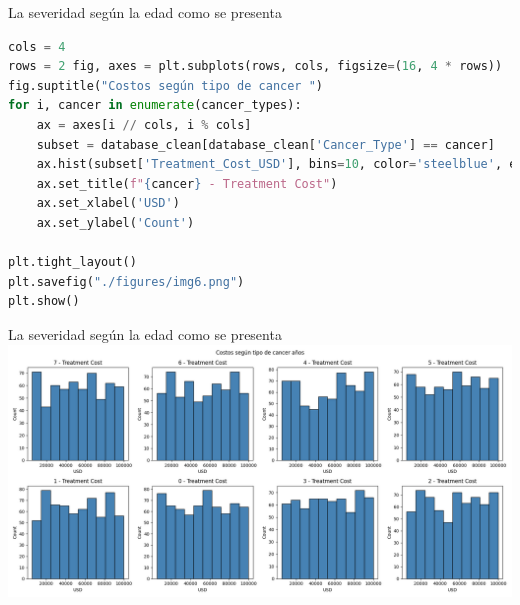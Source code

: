 \documentclass{beamer}
\begin{document}
    \begin{frame}[fragile]{ La severidad según la edad como se presenta }
        \tiny
    \begin{lstlisting}[language=Python]
cols = 4
rows = 2 fig, axes = plt.subplots(rows, cols, figsize=(16, 4 * rows))
fig.suptitle("Costos según tipo de cancer ")
for i, cancer in enumerate(cancer_types):
    ax = axes[i // cols, i % cols]
    subset = database_clean[database_clean['Cancer_Type'] == cancer]
    ax.hist(subset['Treatment_Cost_USD'], bins=10, color='steelblue', edgecolor='black')
    ax.set_title(f"{cancer} - Treatment Cost")
    ax.set_xlabel('USD')
    ax.set_ylabel('Count')

plt.tight_layout()
plt.savefig("./figures/img6.png")
plt.show()
    \end{lstlisting}
    \end{frame}
    \begin{frame}[fragile]{ La severidad según la edad como se presenta }
    \center
    \hspace*{-1cm}
    \includegraphics[width=1.16\textwidth,keepaspectratio]{../figures/img6.png}
    \end{frame}
\end{document}
